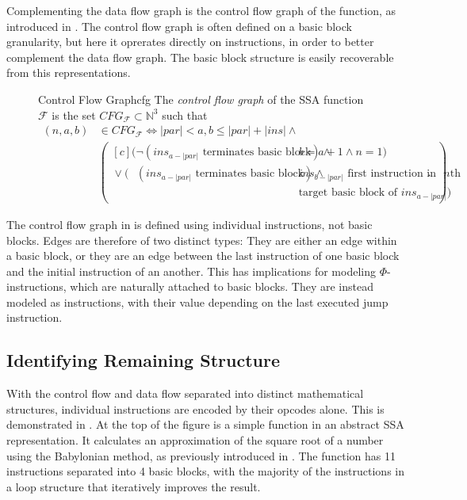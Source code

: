     Complementing the data flow graph is the control flow graph of the function,
    as introduced in .
    The control flow graph is often defined on a basic block granularity, but
    here it oprerates directly on instructions, in order to better complement
    the data flow graph.
    The basic block structure is easily recoverable from this representations.

\begin{figure}[h]
\begin{definition}{Control Flow Graph}{cfg}
    The {\em control flow graph} of the SSA function $\mathcal F$ is the set
    $CFG_{\mathcal F}\subset \mathbb N^3$ such that
    \begin{align*}
        (n,a,b)&{}\in CFG_{\mathcal F}\iff |par|<a,b\leq |par|+|ins|\mathrel{\land}\\
               &\left(\begin{aligned}[c]
                                    (\neg (ins_{a-|par|}\text{ terminates basic block})\mathrel{\land}{}&b=a+1\mathrel{\land}n=1)\\
                      \mathrel{\lor}(\phantom{\neg}(ins_{a-|par|}\text{ terminates basic block})\mathrel{\land}{}&ins_{b-|par|}\text{ first instruction in}\text{ $n$th}\\[-0.5em]
                                                   &\text{target basic block of }ins_{a-|par|})
        \end{aligned}\right).
    \end{align*}
\end{definition}
\end{figure}

    The control flow graph in  is defined using individual
    instructions, not basic blocks.
    Edges are therefore of two distinct types:
    They are either an edge within a basic block, or they are an edge between
    the last instruction of one basic block and the initial instruction of an
    another.
    This has implications for modeling $\Phi$-instructions, which are naturally
    attached to basic blocks.
    They are instead modeled as instructions, with their value depending on the
    last executed jump instruction.

\subsection{Identifying Remaining Structure}

    With the control flow and data flow separated into distinct mathematical
    structures, individual instructions are encoded by their opcodes alone.
    This is demonstrated in .
    At the top of the figure is a simple function in an abstract SSA
    representation.
    It calculates an approximation of the square root of a number using the
    Babylonian method, as previously introduced in .
    The function has 11 instructions separated into 4 basic blocks, with the
    majority of the instructions in a loop structure that iteratively improves
    the result.

